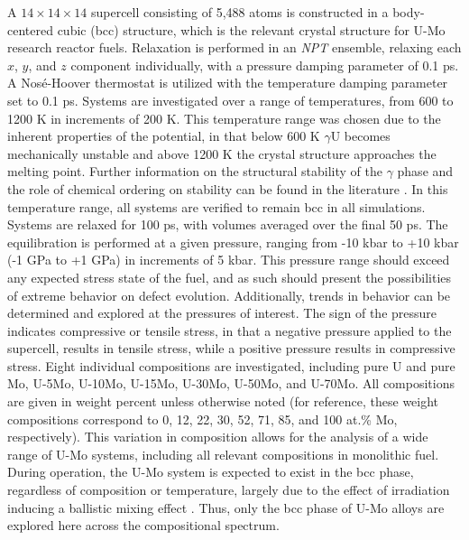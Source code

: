 \documentclass[review]{elsarticle}
\begin{document}
A $14 \times 14 \times 14$ supercell consisting of 5,488 atoms is constructed in a body-centered cubic (bcc) structure, which is the relevant crystal structure for U-Mo research reactor fuels. Relaxation is performed in an \textit{NPT} ensemble, relaxing each $x$, $y$, and $z$ component individually, with a pressure damping parameter of 0.1 ps. A Nos\'e-Hoover thermostat is utilized with the temperature damping parameter set to 0.1 ps. Systems are investigated over a range of temperatures, from 600 to 1200 K in increments of 200 K. This temperature range was chosen due to the inherent properties of the potential, in that below 600 K $\gamma$U becomes mechanically unstable and above 1200 K the crystal structure approaches the melting point. Further information on the structural stability of the $\gamma$ phase and the role of chemical ordering on stability can be found in the literature \cite{chaney2021, soderlind2012}. In this temperature range, all systems are verified to remain bcc in all simulations. Systems are relaxed for 100 ps, with volumes averaged over the final 50 ps. The equilibration is performed at a given pressure, ranging from -10 kbar to +10 kbar (-1 GPa to +1 GPa) in increments of 5 kbar. This pressure range should exceed any expected stress state of the fuel, and as such should present the possibilities of extreme behavior on defect evolution. Additionally, trends in behavior can be determined and explored at the pressures of interest. The sign of the pressure indicates compressive or tensile stress, in that a negative pressure applied to the supercell, results in tensile stress, while a positive pressure results in compressive stress. Eight individual compositions are investigated, including pure U and pure Mo, U-5Mo, U-10Mo, U-15Mo, U-30Mo, U-50Mo, and U-70Mo. All compositions are given in weight percent unless otherwise noted (for reference, these weight compositions correspond to 0, 12, 22, 30, 52, 71, 85, and 100 at.\% Mo, respectively). This variation in composition allows for the analysis of a wide range of U-Mo systems, including all relevant compositions in monolithic fuel. During operation, the U-Mo system is expected to exist in the bcc phase, regardless of composition or temperature, largely due to the effect of irradiation inducing a ballistic mixing effect \cite{meyer2002}. Thus, only the bcc phase of U-Mo alloys are explored here across the compositional spectrum.
\end{document}
